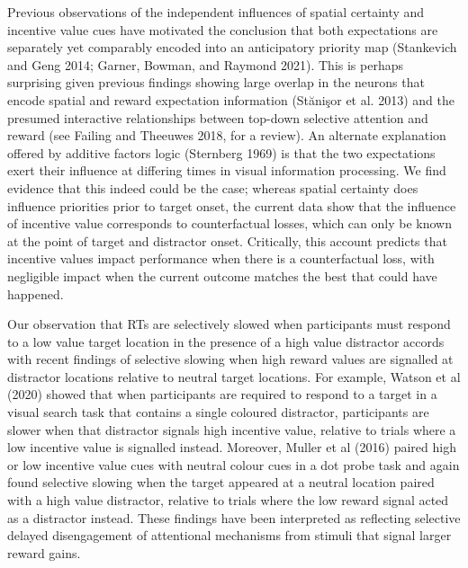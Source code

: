 \documentclass[11pt,halfline,a4paper,]{ouparticle}
\begin{document}
Previous observations of the independent influences of spatial certainty and incentive value cues have motivated the conclusion that both expectations are separately yet comparably encoded into an anticipatory priority map (Stankevich and Geng 2014; Garner, Bowman, and Raymond 2021). This is perhaps surprising given previous findings showing large overlap in the neurons that encode spatial and reward expectation information (Stănişor et al. 2013) and the presumed interactive relationships between top-down selective attention and reward (see Failing and Theeuwes 2018, for a review). An alternate explanation offered by additive factors logic (Sternberg 1969) is that the two expectations exert their influence at differing times in visual information processing. We find evidence that this indeed could be the case; whereas spatial certainty does influence priorities prior to target onset, the current data show that the influence of incentive value corresponds to counterfactual losses, which can only be known at the point of target and distractor onset. Critically, this account predicts that incentive values impact performance when there is a counterfactual loss, with negligible impact when the current outcome matches the best that could have happened.

Our observation that RTs are selectively slowed when participants must respond to a low value target location in the presence of a high value distractor accords with recent findings of selective slowing when high reward values are signalled at distractor locations relative to neutral target locations. For example, Watson et al (2020) showed that when participants are required to respond to a target in a visual search task that contains a single coloured distractor, participants are slower when that distractor signals high incentive value, relative to trials where a low incentive value is signalled instead. Moreover, Muller et al (2016) paired high or low incentive value cues with neutral colour cues in a dot probe task and again found selective slowing when the target appeared at a neutral location paired with a high value distractor, relative to trials where the low reward signal acted as a distractor instead. These findings have been interpreted as reflecting selective delayed disengagement of attentional mechanisms from stimuli that signal larger reward gains.
\end{document}
